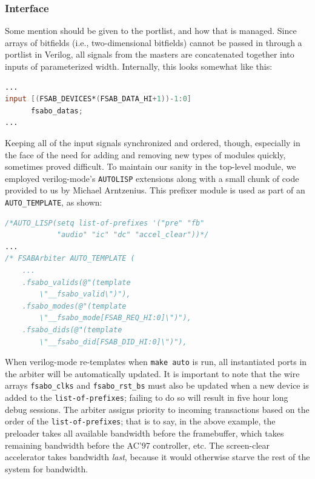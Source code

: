 \documentclass[10pt]{article}
\begin{document}
\subsubsection{Interface}

Some mention should be given to the portlist, and how that is managed. Since
arrays of bitfields (i.e., two-dimensional bitfields) cannot be passed in
through a portlist in Verilog, all signals from the masters are concatenated
together into inputs of parameterized width. Internally, this looks somewhat
like this:

\begin{lstlisting}[basicstyle=\footnotesize,language=Verilog]
...
input [(FSAB_DEVICES*(FSAB_DATA_HI+1))-1:0]
      fsabo_datas;
...
\end{lstlisting}


Keeping all of the input signals synchronized and ordered, though,
especially in the face of the need for adding and removing new types of
modules quickly, sometimes proved difficult. To maintain our sanity in the
top-level module, we employed verilog-mode's \texttt{AUTOLISP} extensions along with
a small chunk of code provided to us by Michael Arntzenius. This prefixer
module is used as part of an \texttt{AUTO\_TEMPLATE}, as shown:

\begin{lstlisting}[basicstyle=\footnotesize,language=Verilog]
/*AUTO_LISP(setq list-of-prefixes '("pre" "fb"
            "audio" "ic" "dc" "accel_clear"))*/
...
/* FSABArbiter AUTO_TEMPLATE (
    ...
    .fsabo_valids(@"(template
        \"__fsabo_valid\")"),
    .fsabo_modes(@"(template
        \"__fsabo_mode[FSAB_REQ_HI:0]\")"),
    .fsabo_dids(@"(template
        \"__fsabo_did[FSAB_DID_HI:0]\")"),
\end{lstlisting}

When verilog-mode re-templates when \texttt{make auto} is run, all
instantiated ports in the arbiter will be automatically updated.  It is
important to note that the wire arrays \texttt{fsabo\_clks} and
\texttt{fsabo\_rst\_bs} must also be updated when a new device is added to the
\texttt{list-of-prefixes}; failing to do so will result in five hour long
debug sessions.  The arbiter assigns priority to incoming transactions based
on the order of the \texttt{list-of-prefixes}; that is to say, in the above
example, the preloader takes all available bandwidth before the framebuffer,
which takes remaining bandwidth before the AC'97 controller, etc.  The
screen-clear accelerator takes bandwidth \textit{last}, because it would otherwise
starve the rest of the system for bandwidth.
\end{document}

